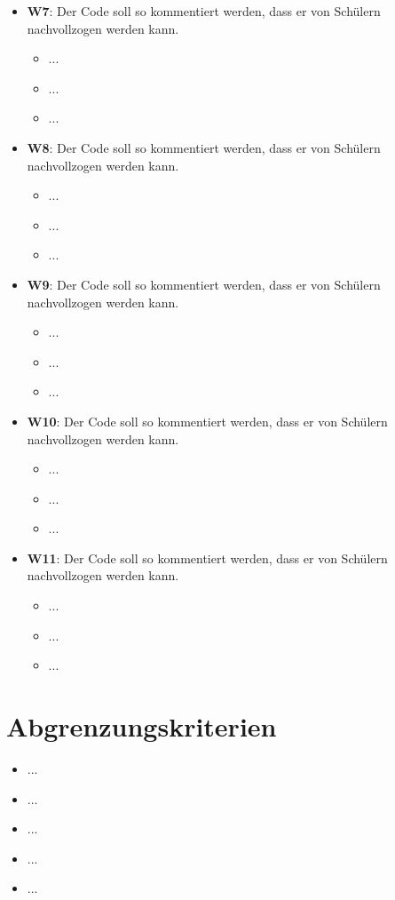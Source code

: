 \documentclass[11pt]{scrreprt}
\begin{document}
\begin{itemize}
\begin{itemize}
    \item ...
    \item ... 
    \end{itemize}
\item \textbf{W7}: Der Code soll so kommentiert werden, dass er von Schülern nachvollzogen werden kann.
    \begin{itemize}
    \item ...
    \item ...
    \item ... 
    \end{itemize}
\item \textbf{W8}: Der Code soll so kommentiert werden, dass er von Schülern nachvollzogen werden kann.
    \begin{itemize}
    \item ...
    \item ...
    \item ... 
    \end{itemize}
\item \textbf{W9}: Der Code soll so kommentiert werden, dass er von Schülern nachvollzogen werden kann.
    \begin{itemize}
    \item ...
    \item ...
    \item ... 
    \end{itemize}
\item \textbf{W10}: Der Code soll so kommentiert werden, dass er von Schülern nachvollzogen werden kann.
    \begin{itemize}
    \item ...
    \item ...
    \item ... 
    \end{itemize}
\item \textbf{W11}: Der Code soll so kommentiert werden, dass er von Schülern nachvollzogen werden kann.
    \begin{itemize}
    \item ...
    \item ...
    \item ... 
    \end{itemize}
    
\end{itemize}

\section{Abgrenzungskriterien}
\begin{itemize}
\item ...
\item ...
\item ...
\item ...
\item ...
\end{itemize}
\end{document}
